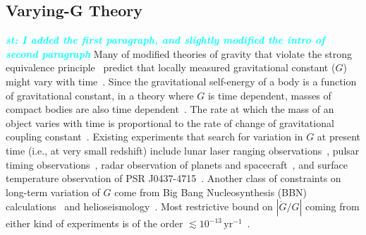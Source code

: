\documentclass[prd,twocolumn,nofootinbib]{revtex4-1}
\newcommand{\st}[1]{\textcolor{cyan}{\it{\textbf{st: #1}}} }
\begin{document}
 \subsection{Varying-G Theory}\label{gdot}
 
 \st{I added the first paragraph, and slightly modified the intro of second paragraph}
Many of modified theories of gravity that violate the strong equivalence principle~\cite{DiCasola:2013iia,Will:2014kxa,0264-9381-7-10-007} predict that locally measured gravitational constant ($G$) might vary with time~\cite{uzan:2010pm}. Since the gravitational self-energy of a body is a function of gravitational constant, in a theory where $G$ is time dependent, masses of compact bodies are also time dependent~\cite{PhysRevLett.65.953}. The rate at which the mass of an object varies with time is proportional to the rate of change of gravitational coupling constant~\cite{PhysRevLett.65.953}. Existing experiments that search for variation in $G$ at present time (i.e., at very small redshift) include lunar laser ranging observations~\cite{Williams:2004qba}, pulsar timing observations~\cite{Deller:2008jx,Kaspi:1994hp}, radar observation of planets and spacecraft~\cite{Pitjeva2005}, and surface temperature observation of PSR J0437-4715~\cite{Jofre:2006ug}. Another class of constraints on long-term variation of $G$ come from Big Bang Nucleosynthesis (BBN) calculations~\cite{Bambi:2005fi,Copi:2003xd} and helioseismology~\cite{0004-637X-498-2-871}. Most restrictive bound on $|\dot{G}/G|$ coming from either kind of experiments is of the order $\lesssim 10^{-13} \,\mathrm{yr}^{-1}$~\cite{Yunes:2009bv}.
\end{document}
